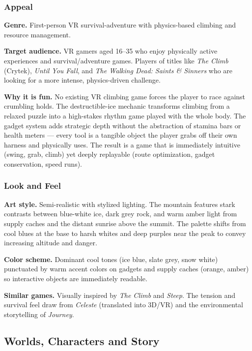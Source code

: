 \documentclass[12pt]{article}
\begin{document}
\subsubsection{Appeal}

\textbf{Genre.} First-person VR survival-adventure with physics-based climbing and resource management.

\textbf{Target audience.} VR gamers aged 16--35 who enjoy physically active experiences and survival/adventure games. Players of titles like \textit{The Climb} (Crytek), \textit{Until You Fall}, and \textit{The Walking Dead: Saints \& Sinners} who are looking for a more intense, physics-driven challenge.

\textbf{Why it is fun.} No existing VR climbing game forces the player to race against crumbling holds. The destructible-ice mechanic transforms climbing from a relaxed puzzle into a high-stakes rhythm game played with the whole body. The gadget system adds strategic depth without the abstraction of stamina bars or health meters --- every tool is a tangible object the player grabs off their own harness and physically uses. The result is a game that is immediately intuitive (swing, grab, climb) yet deeply replayable (route optimization, gadget conservation, speed runs).

\subsubsection{Look and Feel}

\textbf{Art style.} Semi-realistic with stylized lighting. The mountain features stark contrasts between blue-white ice, dark grey rock, and warm amber light from supply caches and the distant sunrise above the summit. The palette shifts from cool blues at the base to harsh whites and deep purples near the peak to convey increasing altitude and danger.

\textbf{Color scheme.} Dominant cool tones (ice blue, slate grey, snow white) punctuated by warm accent colors on gadgets and supply caches (orange, amber) so interactive objects are immediately readable.

\textbf{Similar games.} Visually inspired by \textit{The Climb} and \textit{Steep}. The tension and survival feel draw from \textit{Celeste} (translated into 3D/VR) and the environmental storytelling of \textit{Journey}.

\subsection{Worlds, Characters and Story}
\end{document}
